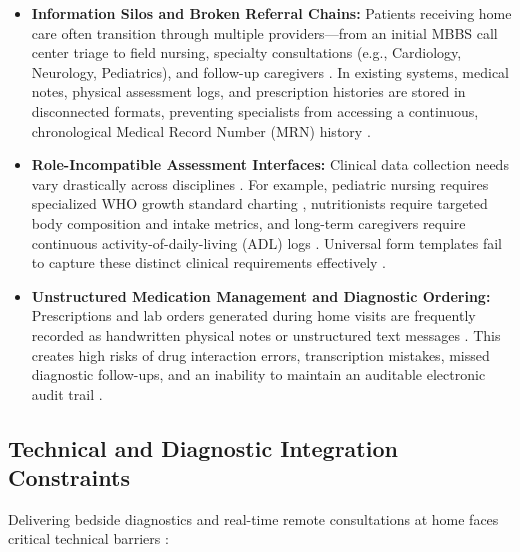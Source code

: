 \documentclass[lettersize,onecolumn,journal]{IEEEtran}
\begin{document}
	\begin{itemize}
		\item \textbf{Information Silos and Broken Referral Chains:} Patients receiving home care often transition through multiple providers—from an initial MBBS call center triage to field nursing, specialty consultations (e.g., Cardiology, Neurology, Pediatrics), and follow-up caregivers \cite{srs2026}. In existing systems, medical notes, physical assessment logs, and prescription histories are stored in disconnected formats, preventing specialists from accessing a continuous, chronological Medical Record Number (MRN) history \cite{srs2026}.
		\item \textbf{Role-Incompatible Assessment Interfaces:} Clinical data collection needs vary drastically across disciplines \cite{srs2026}. For example, pediatric nursing requires specialized WHO growth standard charting \cite{who_child_growth}, nutritionists require targeted body composition and intake metrics, and long-term caregivers require continuous activity-of-daily-living (ADL) logs \cite{srs2026}. Universal form templates fail to capture these distinct clinical requirements effectively \cite{srs2026}.
		\item \textbf{Unstructured Medication Management and Diagnostic Ordering:} Prescriptions and lab orders generated during home visits are frequently recorded as handwritten physical notes or unstructured text messages \cite{srs2026}. This creates high risks of drug interaction errors, transcription mistakes, missed diagnostic follow-ups, and an inability to maintain an auditable electronic audit trail \cite{who2016icd10}.
	\end{itemize}
	
	\subsection{Technical and Diagnostic Integration Constraints}
	Delivering bedside diagnostics and real-time remote consultations at home faces critical technical barriers \cite{srs2026}:
	
\end{document}
